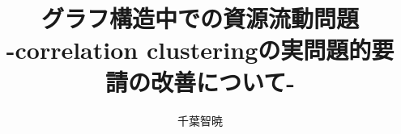\documentclass[a4j]{jarticle}
\title{グラフ構造中での資源流動問題\\-correlation clusteringの実問題的要請の改善について-}
\author{千葉智暁}
\begin{document}
\maketitle

\section{}

\subsection{}







\begin{thebibliography}{9}

  \end{thebibliography}
\end{document}

